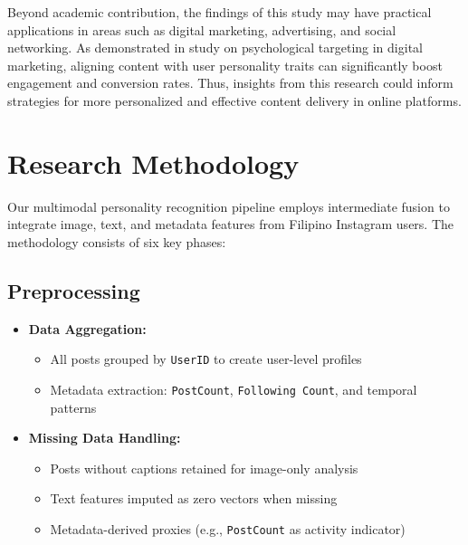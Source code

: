 Beyond academic contribution, the findings of this study may have practical applications in areas such as digital marketing, advertising, and social networking. As demonstrated in \citet{Matz2017} study on psychological targeting in digital marketing, aligning content with user personality traits can significantly boost engagement and conversion rates. Thus, insights from this research could inform strategies for more personalized and effective content delivery in online platforms.




%
%
\section{Research Methodology}
\label{sec:methodology}


Our multimodal personality recognition pipeline employs intermediate fusion to integrate image, text, and metadata features from Filipino Instagram users. The methodology consists of six key phases:

\subsection{Preprocessing}
\label{subsec:preprocessing}

\begin{itemize}
	\item \textbf{Data Aggregation:} 
	\begin{itemize}
		\item All posts grouped by \texttt{UserID} to create user-level profiles
		\item Metadata extraction: \texttt{PostCount}, \texttt{Following Count}, and temporal patterns
	\end{itemize}
	
	\item \textbf{Missing Data Handling:}
	\begin{itemize}
		\item Posts without captions retained for image-only analysis
		\item Text features imputed as zero vectors when missing
		\item Metadata-derived proxies (e.g., \texttt{PostCount} as activity indicator)
	\end{itemize}
\end{itemize}

